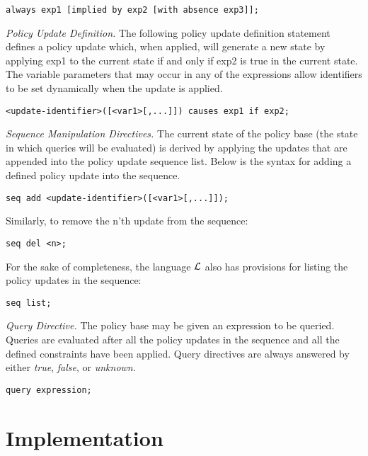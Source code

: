 \documentclass{llncs}
\begin{document}
    \begin{verbatim}always exp1 [implied by exp2 [with absence exp3]];\end{verbatim}

    \emph{Policy Update Definition.} The following policy update definition
    statement defines a policy update which, when applied, will generate a new
    state by applying exp1 to the current state if and only if exp2 is true in
    the current state. The variable parameters that may occur in any of the
    expressions allow identifiers to be set dynamically when the update is
    applied.

    \begin{verbatim}<update-identifier>([<var1>[,...]]) causes exp1 if exp2;\end{verbatim}

    \emph{Sequence Manipulation Directives.} The current state of the policy
    base (the state in which queries will be evaluated) is derived by applying
    the updates that are appended into the policy update sequence list. Below
    is the syntax for adding a defined policy update into the sequence.

    \begin{verbatim}seq add <update-identifier>([<var1>[,...]]);\end{verbatim}

    Similarly, to remove the n'th update from the sequence:

    \begin{verbatim}seq del <n>;\end{verbatim}

    For the sake of completeness, the language $\cal{L}$ also has provisions
    for listing the policy updates in the sequence:

    \begin{verbatim}seq list;\end{verbatim}

    \emph{Query Directive.} The policy base may be given an expression to be
    queried. Queries are evaluated after all the policy updates in the
    sequence and all the defined constraints have been applied. Query
    directives are always answered by either \emph{true}, \emph{false}, or
    \emph{unknown}.

    \begin{verbatim}query expression;\end{verbatim}

  \section{Implementation}
\end{document}
